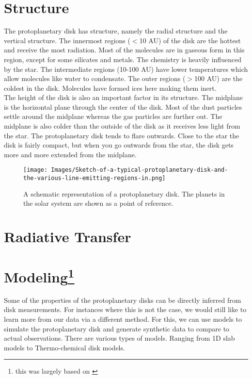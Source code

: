\documentclass[twoside,single]{lion-msc}
\begin{document}
\section{Structure}
The protoplanetary disk has structure, namely the radial structure and the vertical structure. The innermost regions ($<$10 AU) of the disk are the hottest and receive the most radiation. Most of the molecules are in gaseous form in this region, except for some silicates and metals. The chemistry is heavily influenced by the star. The intermediate regions (10-100 AU) have lower temperatures which allow molecules like water to condensate. The outer regions ($>$100 AU) are the coldest in the disk. Molecules have formed ices here making them inert. \\
The height of the disk is also an important factor in its structure. The midplane is the horizontal plane through the center of the disk. Most of the dust particles settle around the midplane whereas the gas particles are further out. The midplane is also colder than the outside of the disk as it receives less light from the star. The protoplanetary disk tends to flare outwards. Close to the star the disk is fairly compact, but when you go outwards from the star, the disk gets more and more extended from the midplane. 

\begin{figure}
    \centering
    \texttt{[image: Images/Sketch-of-a-typical-protoplanetary-disk-and-the-various-line-emitting-regions-in.png]}
    \caption{A schematic representation of a protoplanetary disk. The planets in the solar system are shown as a point of reference. \cite{inproceedings}}
    \label{fig:enter-label}
\end{figure}

\section{Radiative Transfer}
\section{Modeling\protect\footnote{this was largely based on \cite{2015EPJWC.10200013K}}}
Some of the properties of the protoplanetary disks can be directly inferred from disk measurements. For instances where this is not the case, we would still like to learn more from our data via a different method. For this, we can use models to simulate the protoplanetary disk and generate synthetic data to compare to actual observations. There are various types of models. Ranging from 1D slab models to Thermo-chemical disk models. 
\end{document}
